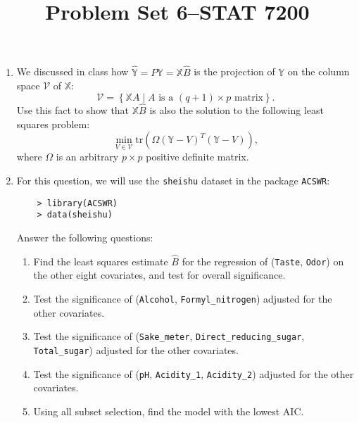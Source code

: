 \documentclass[12pt]{paper}
\title{	
Problem Set 6--STAT 7200
}
\author{} %
\date{} %
\numberwithin{equation}{section} %
\numberwithin{figure}{section} %
\numberwithin{table}{section} %
\begin{document}
\maketitle %


\begin{enumerate}
	\item We discussed in class how $\hat{\mathbb{Y}} = P \mathbb{Y} = \mathbb{X}\hat{B}$ is the projection of $\mathbb{Y}$ on the column space $\mathcal{V}$ of $\mathbb{X}$:
	$$\mathcal{V} = \left\{\mathbb{X}A \mid A\mbox{ is a }(q+1)\times p\mbox{ matrix} \right\}.$$
	Use this fact to show that $\mathbb{X}\hat{B}$ is also the solution to the following least squares problem:
	$$\min_{V \in \mathcal{V}}\mathrm{tr}\left(\Omega(\mathbb{Y} - V)^T(\mathbb{Y} - V)\right),$$ 
	where $\Omega$ is an arbitrary $p\times p$ positive definite matrix.
	
	\vspace{1.5cm}\item For this question, we will use the \texttt{sheishu} dataset in the package \texttt{ACSWR}:
	\begin{verbatim}
	> library(ACSWR)
	> data(sheishu)
	\end{verbatim}
	Answer the following questions:
	\begin{enumerate}
		\item Find the least squares estimate $\hat{B}$ for the regression of (\texttt{Taste}, \texttt{Odor}) on the other eight covariates, and test for overall significance.
		\item Test the significance of (\texttt{Alcohol}, \texttt{Formyl\_nitrogen}) adjusted for the other covariates.
		\item Test the significance of (\texttt{Sake\_meter}, \texttt{Direct\_reducing\_sugar}, \texttt{Total\_sugar}) adjusted for the other covariates.
		\item Test the significance of (\texttt{pH}, \texttt{Acidity\_1}, \texttt{Acidity\_2}) adjusted for the other covariates.
		\item Using all subset selection, find the model with the lowest AIC.
	\end{enumerate}

	
\end{enumerate}
\end{document}
